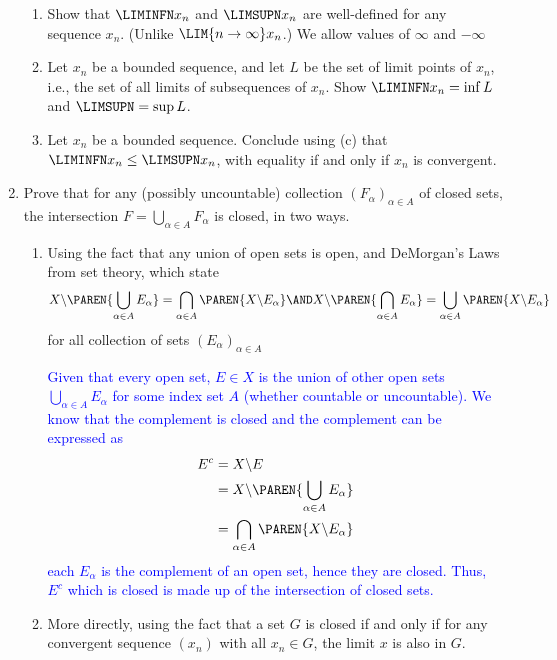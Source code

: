 \documentclass[10pt,a4paper]{report}
\newcommand{\BLUE}[1]{\textcolor{blue}{#1}}
\begin{document}
\begin{enumerate}[label=\Roman*.]
\begin{enumerate}[label=(\alph*)]
		\item Show that $\LIMINFN x_n$ and $\LIMSUPN x_n$ are well-defined for any sequence $x_n$.  (Unlike $\LIM{n\to\infty} x_n$.)  We allow values of $\infty$ and $-\infty$
		
		\item Let $x_n$ be a bounded sequence, and let $L$ be the set of limit points of $x_n$, i.e., the set of all limits of subsequences of $x_n$.  Show $\LIMINFN x_n = \inf L$ and $\LIMSUPN = \sup L$.
		\item Let $x_n$ be a bounded sequence.  Conclude using (c) that $\LIMINFN x_n \le \LIMSUPN x_n$, with equality if and only if $x_n$ is convergent.
	\end{enumerate}
	
	\item Prove that for any (possibly uncountable) collection $(F_\alpha)_{\alpha\in A}$ of closed sets, the intersection $F = \bigcup_{\alpha \in A} F_\alpha$ is closed, in two ways.
	\begin{enumerate}[label=(\alph*)]
		\item Using the fact that any union of open sets is open, and DeMorgan's Laws from set theory, which state
		\begin{align*}
			X\backslash \PAREN{\bigcup_{\alpha\in A} E_\alpha } = \bigcap_{\alpha \in A} \PAREN{X \backslash E_\alpha} \AND X\backslash\PAREN{\bigcap_{\alpha \in A} E_\alpha} = \bigcup_{\alpha\in A} \PAREN{X \backslash E_\alpha}
		\end{align*}for all collection of sets $(E_\alpha)_{\alpha\in A}$
		
		\BLUE{Given that every open set, $E\in X$ is the union of other open sets $\bigcup_{\alpha \in A} E_\alpha$ for some index set $A$ (whether countable or uncountable).  We know that the complement is closed and the complement can be expressed as
		\begin{align*}
			E^c &= X\backslash E \\
			&= X\backslash \PAREN{\bigcup_{\alpha\in A} E_\alpha }\\
			&= \bigcap_{\alpha \in A} \PAREN{X \backslash E_\alpha}
		\end{align*}each $E_\alpha$ is the complement of an open set, hence they are closed.  Thus, $E^c$ which is closed is made up of the intersection of closed sets.
		}
		
		\item More directly, using the fact that a set $G$ is closed if and only if for any convergent sequence $(x_n)$ with all $x_n \in G$, the limit $x$ is also in $G$.
		

\end{enumerate}
\end{enumerate}
\end{document}
